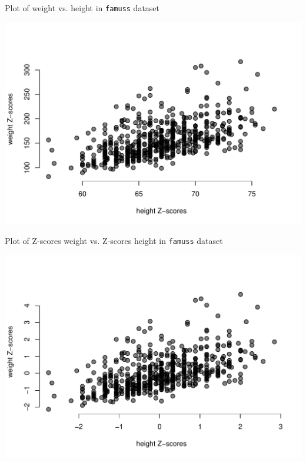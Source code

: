\documentclass[10pt]{beamer}\usepackage[]{graphicx}\usepackage[]{color}
\makeatletter
\def\maxwidth{ %
  \ifdim\Gin@nat@width>\linewidth
    \linewidth
  \else
    \Gin@nat@width
  \fi
}
\newenvironment{knitrout}{}{} %
\makeatother
\begin{document}
\begin{frame}[fragile]{Plot of weight vs. height in \texttt{famuss} dataset}
	
\begin{knitrout}\tiny
{}\color{fgcolor}

{\centering \includegraphics[width=\maxwidth]{figure/unnamed-chunk-1-1} 

}



\end{knitrout}
	
\end{frame}


\begin{frame}[fragile]{Plot of Z-scores weight vs. Z-scores height in \texttt{famuss} dataset}

\begin{knitrout}\tiny
{}\color{fgcolor}

{\centering \includegraphics[width=\maxwidth]{figure/unnamed-chunk-2-1} 

}



\end{knitrout}

\end{frame}
\end{document}
